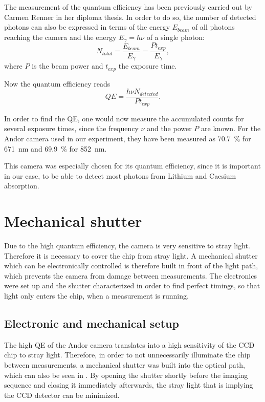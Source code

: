 The measurement of the quantum efficiency has been previously carried out by Carmen Renner \cite{Renner2014} in her diploma thesis. In order to do so, the number of detected photons can also be expressed in terms of the energy $E_{beam}$ of all photons reaching the camera and the energy $E_{\gamma} = h\nu$ of a single photon\cite{Murmann2011}:
\begin{equation}
N_{total} = \frac{E_{beam}}{E_\gamma} = \frac{P t_{exp}}{E_\gamma},
\end{equation}
where $P$ is the beam power and $t_{exp}$ the exposure time.

Now the quantum efficiency reads
\begin{equation}
QE = \frac{h \nu N_{detected}}{P t_{exp}}.
\end{equation}

In order to find the QE, one would now measure the accumulated counts for several exposure times, since the frequency $\nu$ and the power $P$ are known. For the Andor camera used in our experiment, they have been measured as \SI{70.7}{\percent} for \SI{671}{\nano\meter} and \SI{69.9}{\percent} for \SI{852}{\nano\meter}.

This camera was especially chosen for its quantum efficiency, since it is important in our case, to be able to detect most photons from Lithium and Caesium absorption.

\section{Mechanical shutter}
\label{sec:shutter}

Due to the high quantum efficiency, the camera is very sensitive to stray light. Therefore it is necessary to cover the chip from stray light. A mechanical shutter which can be electronically controlled is therefore built in front of the light path, which prevents the camera from damage between measurements. The electronics were set up and the shutter characterized in order to find perfect timings, so that light only enters the chip, when a measurement is running.

\subsection{Electronic and mechanical setup}
\label{subsec:shutter_electronic}

The high QE of the Andor camera translates into a high sensitivity of the CCD chip to stray light. Therefore, in order to not unnecessarily illuminate the chip between measurements, a mechanical shutter was built into the optical path, which can also be seen in . By opening the shutter shortly before the imaging sequence and closing it immediately afterwards, the stray light that is implying the CCD detector can be minimized.


